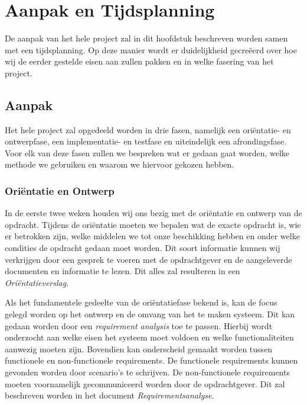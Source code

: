 \section{Aanpak en Tijdsplanning}
De aanpak van het hele project zal in dit hoofdstuk beschreven worden samen met een tijdsplanning. Op deze manier wordt er duidelijkheid gecre\"eerd over hoe wij de eerder gestelde eisen aan zullen pakken en in welke fasering van het project.

\subsection{Aanpak}
Het hele project zal opgedeeld worden in drie fasen, namelijk een ori\"entatie- en ontwerpfase, een implementatie- en testfase en uiteindelijk een afrondingsfase. Voor elk van deze fasen zullen we bespreken wat er gedaan gaat worden, welke methode we gebruiken en waarom we hiervoor gekozen hebben. 

\subsubsection{Ori\"entatie en Ontwerp}
In de eerste twee weken houden wij ons bezig met de ori\"entatie en ontwerp van de opdracht. Tijdens de ori\"entatie moeten we bepalen wat de exacte opdracht is, wie er betrokken zijn, welke middelen we tot onze beschikking hebben en onder welke condities de opdracht gedaan moet worden. Dit soort informatie kunnen wij verkrijgen door een gesprek te voeren met de opdrachtgever en de aangeleverde documenten en informatie te lezen. Dit alles zal resulteren in een \emph{Ori\"entatieverslag}.

Als het fundamentele gedeelte van de ori\"entatiefase bekend is, kan de focus gelegd worden op het ontwerp en de omvang van het te maken systeem. Dit kan gedaan worden door een \emph{requirement analysis} toe te passen. Hierbij wordt onderzocht aan welke eisen het systeem moet voldoen en welke functionaliteiten aanwezig moeten zijn. Bovendien kan onderscheid gemaakt worden tussen functionele en non-functionele requirements. De functionele requirements kunnen gevonden worden door scenario's te schrijven. De non-functionele requirements moeten voornamelijk gecommuniceerd worden door de opdrachtgever. Dit zal beschreven worden in het document \emph{Requirementsanalyse}.

